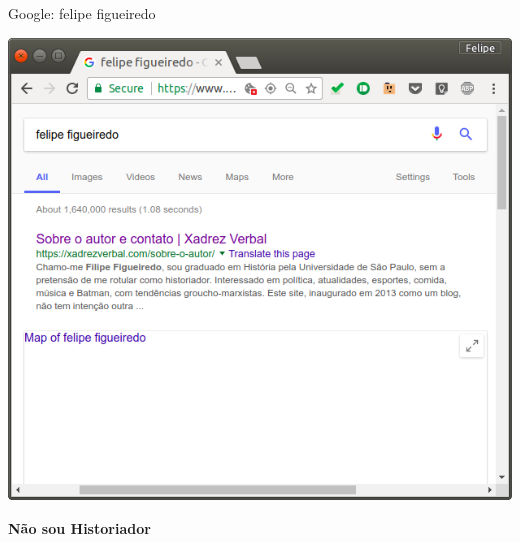 \documentclass{beamer}
\begin{document}
\begin{frame}{Google: felipe figueiredo}
  \begin{center}
    \includegraphics[height=.7\textheight]{Intro/felipefigueiredo-not1}
    \begin{exampleblock}{}
      \begin{center}
        {\bf Não sou Historiador}
      \end{center}
    \end{exampleblock}
  \end{center}
\end{frame}
\end{document}
